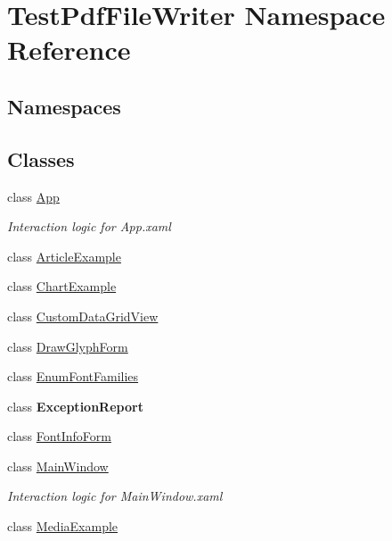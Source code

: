 \hypertarget{namespace_test_pdf_file_writer}{}\section{Test\+Pdf\+File\+Writer Namespace Reference}
\label{namespace_test_pdf_file_writer}
\subsection*{Namespaces}
\begin{DoxyCompactItemize}
\end{DoxyCompactItemize}
\subsection*{Classes}
\begin{DoxyCompactItemize}
\item 
class \hyperlink{class_test_pdf_file_writer_1_1_app}{App}
\begin{DoxyCompactList}\small\item\em Interaction logic for App.\+xaml \end{DoxyCompactList}\item 
class \hyperlink{class_test_pdf_file_writer_1_1_article_example}{Article\+Example}
\item 
class \hyperlink{class_test_pdf_file_writer_1_1_chart_example}{Chart\+Example}
\item 
class \hyperlink{class_test_pdf_file_writer_1_1_custom_data_grid_view}{Custom\+Data\+Grid\+View}
\item 
class \hyperlink{class_test_pdf_file_writer_1_1_draw_glyph_form}{Draw\+Glyph\+Form}
\item 
class \hyperlink{class_test_pdf_file_writer_1_1_enum_font_families}{Enum\+Font\+Families}
\item 
class {\bfseries Exception\+Report}
\item 
class \hyperlink{class_test_pdf_file_writer_1_1_font_info_form}{Font\+Info\+Form}
\item 
class \hyperlink{class_test_pdf_file_writer_1_1_main_window}{Main\+Window}
\begin{DoxyCompactList}\small\item\em Interaction logic for Main\+Window.\+xaml \end{DoxyCompactList}\item 
class \hyperlink{class_test_pdf_file_writer_1_1_media_example}{Media\+Example}
\item 

\end{DoxyCompactItemize}
